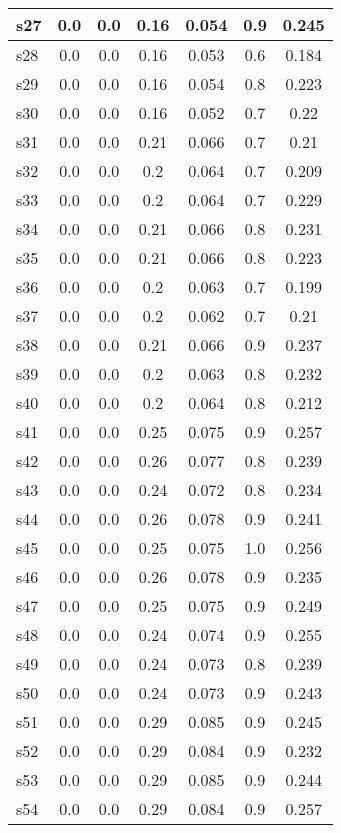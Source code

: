 \documentclass{article}
\begin{document}
\begin{tabular}{|l|c|c|c|c|c|c|}
\hline
s27 &0.0 & 0.0 & 0.16 & 0.054 & 0.9 & 0.245\\
\hline
s28 &0.0 & 0.0 & 0.16 & 0.053 & 0.6 & 0.184\\
\hline
s29 &0.0 & 0.0 & 0.16 & 0.054 & 0.8 & 0.223\\
\hline
s30 &0.0 & 0.0 & 0.16 & 0.052 & 0.7 & 0.22\\
\hline
s31 &0.0 & 0.0 & 0.21 & 0.066 & 0.7 & 0.21\\
\hline
s32 &0.0 & 0.0 & 0.2 & 0.064 & 0.7 & 0.209\\
\hline
s33 &0.0 & 0.0 & 0.2 & 0.064 & 0.7 & 0.229\\
\hline
s34 &0.0 & 0.0 & 0.21 & 0.066 & 0.8 & 0.231\\
\hline
s35 &0.0 & 0.0 & 0.21 & 0.066 & 0.8 & 0.223\\
\hline
s36 &0.0 & 0.0 & 0.2 & 0.063 & 0.7 & 0.199\\
\hline
s37 &0.0 & 0.0 & 0.2 & 0.062 & 0.7 & 0.21\\
\hline
s38 &0.0 & 0.0 & 0.21 & 0.066 & 0.9 & 0.237\\
\hline
s39 &0.0 & 0.0 & 0.2 & 0.063 & 0.8 & 0.232\\
\hline
s40 &0.0 & 0.0 & 0.2 & 0.064 & 0.8 & 0.212\\
\hline
s41 &0.0 & 0.0 & 0.25 & 0.075 & 0.9 & 0.257\\
\hline
s42 &0.0 & 0.0 & 0.26 & 0.077 & 0.8 & 0.239\\
\hline
s43 &0.0 & 0.0 & 0.24 & 0.072 & 0.8 & 0.234\\
\hline
s44 &0.0 & 0.0 & 0.26 & 0.078 & 0.9 & 0.241\\
\hline
s45 &0.0 & 0.0 & 0.25 & 0.075 & 1.0 & 0.256\\
\hline
s46 &0.0 & 0.0 & 0.26 & 0.078 & 0.9 & 0.235\\
\hline
s47 &0.0 & 0.0 & 0.25 & 0.075 & 0.9 & 0.249\\
\hline
s48 &0.0 & 0.0 & 0.24 & 0.074 & 0.9 & 0.255\\
\hline
s49 &0.0 & 0.0 & 0.24 & 0.073 & 0.8 & 0.239\\
\hline
s50 &0.0 & 0.0 & 0.24 & 0.073 & 0.9 & 0.243\\
\hline
s51 &0.0 & 0.0 & 0.29 & 0.085 & 0.9 & 0.245\\
\hline
s52 &0.0 & 0.0 & 0.29 & 0.084 & 0.9 & 0.232\\
\hline
s53 &0.0 & 0.0 & 0.29 & 0.085 & 0.9 & 0.244\\
\hline
s54 &0.0 & 0.0 & 0.29 & 0.084 & 0.9 & 0.257\\
\hline

\end{tabular}
\end{document}
